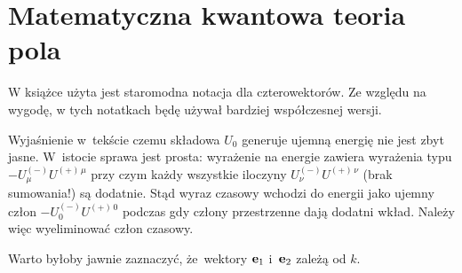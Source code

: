 \documentclass[a4paper,11pt]{article}
\begin{document}
\vspace{\spaceTwo}










\section{Matematyczna kwantowa teoria pola}

\vspace{\spaceTwo}








W książce użyta jest staromodna notacja dla czterowektorów. Ze względu na wygodę, w tych notatkach będę używał bardziej współczesnej wersji.







 Wyjaśnienie w~tekście czemu składowa $U_{ 0 }$
generuje ujemną energię nie jest zbyt jasne. W~istocie sprawa jest
prosta: wyrażenie na energie zawiera wyrażenia typu
$-U^{ ( - ) }_{ \mu } U^{ ( + )\, \mu }$ przy czym każdy wszystkie
iloczyny $U^{ ( - ) }_{ \nu } U^{ ( + )\, \nu }$ (brak sumowania!)
są dodatnie. Stąd wyraz czasowy wchodzi do energii jako ujemny człon
$-U^{ ( - ) }_{ 0 } U^{ ( + )\, 0 }$ podczas gdy człony przestrzenne
dają dodatni wkład. Należy więc wyeliminować człon czasowy.

\vspace{\spaceFour}



 Warto byłoby jawnie zaznaczyć, że~wektory $\mathbf{e}_{ 1 }$
i~$\mathbf{e}_{ 2 }$ zależą od $k$.

\vspace{\spaceFour}




\vspace{\spaceFour}
\end{document}

